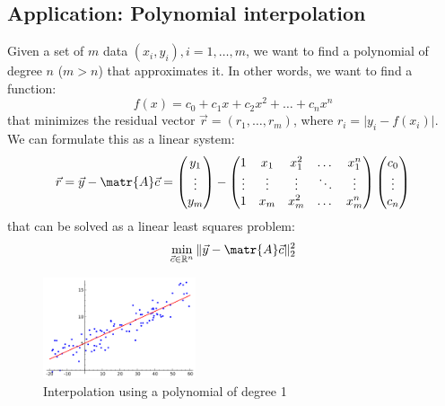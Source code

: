 \subsection{Application: Polynomial interpolation}
Given a set of $m$ data $(x_i, y_i), i=1, \dots, m$, 
we want to find a polynomial of degree $n$ ($m > n$) that approximates it.
In other words, we want to find a function:
\[ f(x) = c_0 + c_1 x + c_2 x^2 + \dots + c_n x^n \]
that minimizes the residual vector $\vec{r} = (r_1, \dots, r_m)$, 
where $r_i = \vert y_i - f(x_i) \vert$.
We can formulate this as a linear system:
\[
    \vec{r} = \vec{y} - \matr{A}\vec{c} = 
    \begin{pmatrix}
        y_1     \\
        \vdots  \\
        y_m
    \end{pmatrix}
    -
    \begin{pmatrix}
        1       & x_1    & x_1^2    & \dots     & x_1^n  \\
        \vdots  & \vdots & \vdots   & \ddots    & \vdots \\ 
        1       & x_m    & x_m^2    & \dots     & x_m^n  
    \end{pmatrix}
    \begin{pmatrix}
        c_0     \\
        \vdots  \\
        c_n
    \end{pmatrix}
\]
that can be solved as a linear least squares problem:
\[ \min_{\vec{c} \in \mathbb{R}^n} \Vert \vec{y} - \matr{A}\vec{c} \Vert_2^2 \]

\begin{figure}[h]
    \centering
    \includegraphics[width=0.40\textwidth]{img/linear_regression.png}
    \caption{Interpolation using a polynomial of degree 1}
\end{figure}



